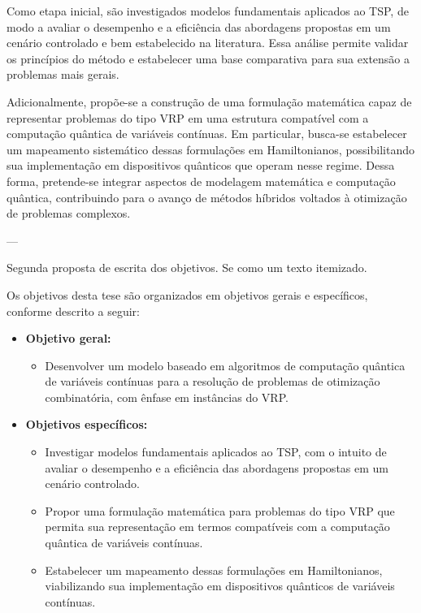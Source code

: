 Como etapa inicial, são investigados modelos fundamentais aplicados ao TSP, de modo a avaliar o desempenho e a eficiência das abordagens propostas em um cenário controlado e bem estabelecido na literatura. Essa análise permite validar os princípios do método e estabelecer uma base comparativa para sua extensão a problemas mais gerais.

Adicionalmente, propõe-se a construção de uma formulação matemática capaz de representar problemas do tipo VRP em uma estrutura compatível com a computação quântica de variáveis contínuas. Em particular, busca-se estabelecer um mapeamento sistemático dessas formulações em Hamiltonianos, possibilitando sua implementação em dispositivos quânticos que operam nesse regime. Dessa forma, pretende-se integrar aspectos de modelagem matemática e computação quântica, contribuindo para o avanço de métodos híbridos voltados à otimização de problemas complexos.


---

{\color{red}Segunda proposta de escrita dos objetivos. Se como um texto itemizado.}

Os objetivos desta tese são organizados em objetivos gerais e específicos, conforme descrito a seguir:

\begin{itemize}
    \item \textbf{Objetivo geral:}
    \begin{itemize}
        \item Desenvolver um modelo baseado em algoritmos de computação quântica de variáveis contínuas para a resolução de problemas de otimização combinatória, com ênfase em instâncias do VRP.
    \end{itemize}

    \item \textbf{Objetivos específicos:}
    \begin{itemize}
        \item Investigar modelos fundamentais aplicados ao TSP, com o intuito de avaliar o desempenho e a eficiência das abordagens propostas em um cenário controlado.

        \item Propor uma formulação matemática para problemas do tipo VRP que permita sua representação em termos compatíveis com a computação quântica de variáveis contínuas.

        \item Estabelecer um mapeamento dessas formulações em Hamiltonianos, viabilizando sua implementação em dispositivos quânticos de variáveis contínuas.
    \end{itemize}
\end{itemize}